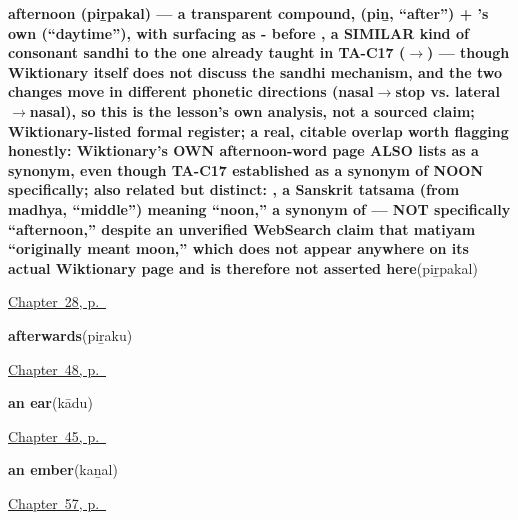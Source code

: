 \noindent\begin{minipage}[t]{\linewidth}
\raggedright
\textbf{afternoon (piṟpakal) — a transparent compound,  (piṉ, \textquotedblleft{}after\textquotedblright{}) + 's own  (\textquotedblleft{}daytime\textquotedblright{}), with  surfacing as - before , a SIMILAR kind of consonant sandhi to the one already taught in TA-C17 ($\to$) — though Wiktionary itself does not discuss the sandhi mechanism, and the two changes move in different phonetic directions (nasal$\to$stop vs. lateral$\to$nasal), so this is the lesson's own analysis, not a sourced claim; Wiktionary-listed formal register; a real, citable overlap worth flagging honestly: Wiktionary's OWN afternoon-word page ALSO lists  as a synonym, even though TA-C17 established  as a synonym of NOON specifically; also related but distinct: , a Sanskrit tatsama (from madhya, \textquotedblleft{}middle\textquotedblright{}) meaning \textquotedblleft{}noon,\textquotedblright{} a synonym of  — NOT specifically \textquotedblleft{}afternoon,\textquotedblright{} despite an unverified WebSearch claim that matiyam \textquotedblleft{}originally meant moon,\textquotedblright{} which does not appear anywhere on its actual Wiktionary page and is therefore not asserted here}\enspace\emph{}\enspace(piṟpakal)\par
\footnotesize \hyperref[ch:ta-afternoon]{Chapter~28, p.~\pageref*{ch:ta-afternoon}}
\end{minipage}\par\smallskip

\noindent\begin{minipage}[t]{\linewidth}
\raggedright
\textbf{afterwards}\enspace\emph{}\enspace(piṟaku)\par
\footnotesize \hyperref[ch:ta-setting-out]{Chapter~48, p.~\pageref*{ch:ta-setting-out}}
\end{minipage}\par\smallskip

\noindent\begin{minipage}[t]{\linewidth}
\raggedright
\textbf{an ear}\enspace\emph{}\enspace(kādu)\par
\footnotesize \hyperref[ch:ta-body-more]{Chapter~45, p.~\pageref*{ch:ta-body-more}}
\end{minipage}\par\smallskip

\noindent\begin{minipage}[t]{\linewidth}
\raggedright
\textbf{an ember}\enspace\emph{}\enspace(kaṉal)\par
\footnotesize \hyperref[ch:ta-wind-and-fire]{Chapter~57, p.~\pageref*{ch:ta-wind-and-fire}}
\end{minipage}\par\smallskip

